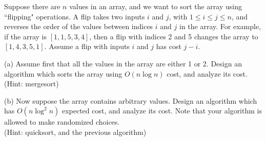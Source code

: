 \problem{}
Suppose there are $n$ values in an array, and we want to sort the array using ``flipping" operations.  A flip takes two inputs $i$ and $j$, with $1 \leq i \leq j \leq n$, and reverses the order of the values between indices $i$ and $j$ in the array.  For example, if the array is $[1,1,5,3,4]$, then a flip with indices 2 and 5 changes the array to $[1,4,3,5,1]$.  Assume a flip with inputs $i$ and $j$ has cost $j-i$.  

\hspace*{\fill}

\noindent (a) Assume first that all the values in the array are either 1 or 2.  Design an algorithm which sorts the array using $O(n \log n)$ cost, and analyze its cost.  \\
(Hint: mergesort)

\hspace*{\fill}

\noindent (b) Now suppose the array contains arbitrary values.   Design an algorithm which has $O(n \log^2 n)$ expected cost, and analyze its cost.  Note that your algorithm is allowed to make randomized choices. \\
(Hint: quicksort, and the previous algorithm)

\solution{

}

\newpage